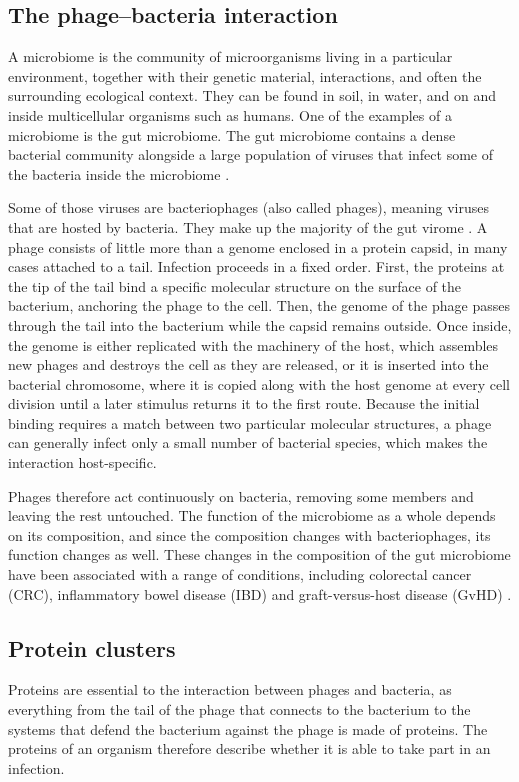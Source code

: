 
\subsection{The phage--bacteria interaction}
A microbiome is the community of microorganisms living in a particular environment, together with their genetic 
material, interactions, and often the surrounding ecological context. They can be found in soil, in water, and on 
and inside multicellular organisms such as humans. One of the examples of a microbiome is the gut microbiome. 
The gut microbiome contains a dense bacterial community alongside a large population of
viruses that infect some of the bacteria inside the microbiome \citep{shkoporov2019}.

Some of those viruses are bacteriophages (also called phages), meaning viruses that are hosted by bacteria. 
They make up the majority of the gut virome \citep{shkoporov2019}. A phage consists of little
more than a genome enclosed in a protein capsid, in many cases attached to a tail. Infection proceeds in a 
fixed order. First, the proteins at the tip of the tail bind a specific molecular structure on the surface 
of the bacterium, anchoring the phage to the cell. Then, the genome of the phage passes through the tail
into the bacterium while the capsid remains outside. Once inside, the genome is either replicated
with the machinery of the host, which assembles new phages and destroys the cell as they are released, 
or it is inserted into the bacterial chromosome, where it is copied along with the host genome at every cell division until a
later stimulus returns it to the first route. Because the initial binding requires a match between two particular 
molecular structures, a phage can generally infect only a small number of bacterial species, which makes the 
interaction host-specific. 

Phages therefore act continuously on bacteria, removing some members and leaving the rest untouched.
The function of the microbiome as a whole depends on its composition, and since the composition changes with
bacteriophages, its function changes as well. These changes in the composition
of the gut microbiome have been associated with a range of conditions, including colorectal cancer (CRC), 
inflammatory bowel disease (IBD) and graft-versus-host disease (GvHD) \citep{wirbel2019,lloydprice2019,peled2020}.

\subsection{Protein clusters}
Proteins are essential to the interaction between phages and bacteria, as everything from the tail
of the phage that connects to the bacterium to the systems that defend the bacterium against the phage is made
of proteins. The proteins of an organism therefore describe whether it is able to take part in 
an infection.

